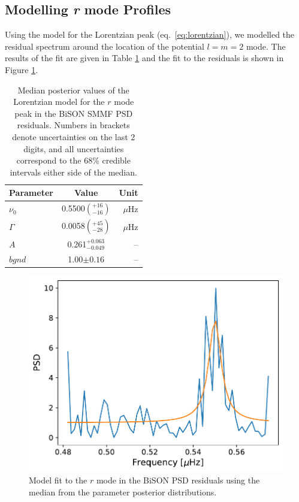 \subsection{Modelling {\it r} mode Profiles}

Using the model for the Lorentzian peak (eq.~\ref{eq:lorentzian}), we modelled the residual spectrum around the location of the potential  $l=m=2$ mode. The results of the fit are given in Table \ref{tab:rmode_fit_params} and the fit to the residuals is shown in Figure \ref{fig:rmode_asymm_fit}.

\begin{table}[!ht]
	\begin{center}
		\caption{Median posterior values of the Lorentzian model for the $r$ mode peak in the BiSON SMMF PSD residuals. Numbers in brackets denote uncertainties on the last 2 digits, and all uncertainties correspond to the 68\% credible intervals either side of the median.}
		\label{tab:rmode_fit_params}
		\begin{tabular}{l c r}
			\hline
			{Parameter} & {Value} & {Unit} \\
			\hline
			
			{$\nu_0$} & {0.5500$\left(_{-16}^{+16}\right)$} & {$\mu\mathrm{Hz} $}\\
			
			{$\Gamma$} & {0.0058$\left(_{-28}^{+45}\right)$} & {$\mu\mathrm{Hz} $} \\
			
			{$A$} & {0.261$_{-0.049}^{+0.063}$} & {--} \\
			
			
			{$bgnd$} & {1.00$\pm 0.16$} & {--} \\	
			
			\hline
		\end{tabular}
	\end{center}
\end{table}

\begin{figure}[!ht]
	\centering
	\includegraphics[width=0.65\columnwidth]{asymm_r-mode_model_fit.pdf}
	\caption{Model fit to the $r$ mode in the BiSON PSD residuals using the median from the parameter posterior distributions.}  \label{fig:rmode_asymm_fit}
\end{figure}

